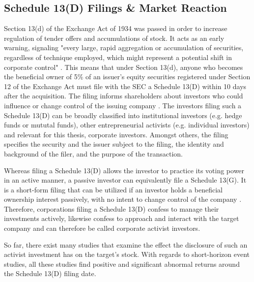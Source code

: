 \documentclass[12pt]{article}
\begin{document}
\subsection{Schedule 13(D) Filings \& Market Reaction}

\noindent Section 13(d) of the Exchange Act of 1934 was passed in order to increase regulation of tender offers and accumulations of stock.
It acts as an early warning, signaling "every large, rapid aggregation or accumulation of securities, regardless of technique employed, which might represent a potential shift in corporate control" \citep[p.2]{Morrison2015}. This means that under Section 13(d), anyone who becomes the beneficial owner of 5\% of an issuer's equity securities registered under Section 12 of the Exchange Act must file with the SEC a Schedule 13(D) within 10 days after the acquisition. The filing informs shareholders about investors who could influence or change control of the issuing company \citep[p.110]{Giglia2016}. The investors filing such a Schedule 13(D) can be broadly classified into institutional investors (e.g. hedge funds or mututal funds), other entrepreneurial activists (e.g. individual investors) \citep[p.188]{Klein2009} and relevant for this thesis, corporate investors. Amongst others, the filing specifies the security and the issuer subject to the filing, the identity and background of the filer, and the purpose of the transaction.\par
Whereas filing a Schedule 13(D) allows the investor to practice its voting power in an active manner, a passive investor can equivalently file a Schedule 13(G). It is a short-form filing that can be utilized if an investor holds a beneficial ownership interest passively, with no intent to change control of the company \citep{Giglia2016}. Therefore, corporations filing a Schedule 13(D) confess to manage their investments actively, likewise confess to approach and interact with the target company and can therefore be called corporate activist investors.\par
So far, there exist many studies that examine the effect the disclosure of such an activist investment has on the target's stock. With regards to short-horizon event studies, all these studies find positive and significant abnormal returns around the Schedule 13(D) filing date. 
\end{document}
